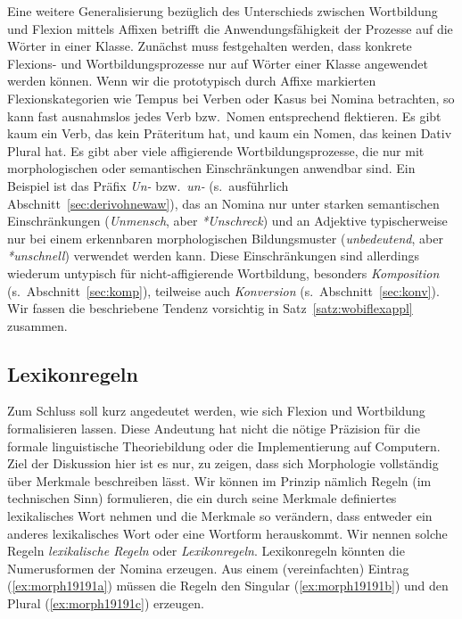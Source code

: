 Eine weitere Generalisierung bezüglich des Unterschieds zwischen Wortbildung und Flexion mittels Affixen betrifft die Anwendungsfähigkeit der Prozesse auf die Wörter in einer Klasse.
Zunächst muss festgehalten werden, dass konkrete Flexions- und Wortbildungsprozesse nur auf Wörter einer Klasse angewendet werden können.
Wenn wir die prototypisch durch Affixe markierten Flexionskategorien wie Tempus bei Verben oder Kasus bei Nomina betrachten, so kann fast ausnahmslos jedes Verb bzw.\ Nomen entsprechend flektieren.
Es gibt \zB kaum ein Verb, das kein Präteritum hat, und kaum ein Nomen, das keinen Dativ Plural hat.
Es gibt aber viele affigierende Wortbildungsprozesse, die nur mit morphologischen oder semantischen Einschränkungen anwendbar sind.
Ein Beispiel ist das Präfix \textit{Un-} bzw.\ \textit{un-} (s.\ ausführlich Abschnitt~\ref{sec:derivohnewaw}), das an Nomina nur unter starken semantischen Einschränkungen (\textit{Unmensch}, aber \textit{*Unschreck}) und an Adjektive typischerweise nur bei einem erkennbaren morphologischen Bildungsmuster (\textit{unbedeutend}, aber \textit{*unschnell}) verwendet werden kann.
Diese Einschränkungen sind allerdings wiederum untypisch für nicht-affigierende Wortbildung, besonders \textit{Komposition} (s.\ Abschnitt~\ref{sec:komp}), teilweise auch \textit{Konversion} (s.\ Abschnitt~\ref{sec:konv}).
Wir fassen die beschriebene Tendenz vorsichtig in Satz~\ref{satz:wobiflexappl} zusammen.

\Stretch[0.5]


\subsection{Lexikonregeln}

\label{sec:lexikonregel}

Zum Schluss soll kurz angedeutet werden, wie sich Flexion und Wortbildung formalisieren lassen.
Diese Andeutung hat nicht die nötige Präzision für die formale linguistische Theoriebildung oder die Implementierung auf Computern.
Ziel der Diskussion hier ist es nur, zu zeigen, dass sich Morphologie vollständig über Merkmale beschreiben lässt.
Wir können im Prinzip nämlich Regeln (im technischen Sinn) formulieren, die ein durch seine Merkmale definiertes lexikalisches Wort nehmen und die Merkmale so verändern, dass entweder ein anderes lexikalisches Wort oder eine Wortform herauskommt.
Wir nennen solche Regeln \textit{lexikalische Regeln} oder \textit{Lexikonregeln}.
Lexikonregeln könnten \zB die Numerusformen der Nomina erzeugen.
Aus einem (vereinfachten) Eintrag (\ref{ex:morph19191a}) müssen die Regeln den Singular (\ref{ex:morph19191b}) und den Plural (\ref{ex:morph19191c}) erzeugen.


